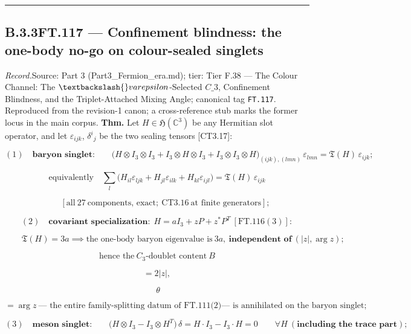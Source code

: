 \documentclass[11pt,openany]{report}
\theoremstyle{canonplain}
\theoremstyle{canondef}
\begin{document}
\vspace{2pt}\noindent\rule{\textwidth}{0.4pt}\vspace{2pt}

\medskip
\subsection*{\texorpdfstring{B.3.3\quad FT.117 — Confinement blindness: the one-body no-go on colour-sealed singlets}{FT.117 B.3.3}}
\label{tag:FT-117}
{\small \textit{Record.}\quad Source: Part 3 (Part3\_Fermion\_era.md); tier: Tier F.38 — The Colour Channel: The $\textbackslash{}varepsilon$-Selected $C\_3$, Confinement Blindness, and the Triplet-Attached Mixing Angle; canonical tag \texttt{FT.117}. Reproduced from the revision-1 canon; a cross-reference stub marks the former locus in the main corpus.}
\medskip
\textbf{Thm.} Let $H\in\mathfrak H(\mathbb C^3)$ be any Hermitian slot operator, and let $\varepsilon_{ijk}$, $\delta^i{}_j$ be the two sealing tensors [CT3.17]:

\[
(1)\quad\textbf{baryon singlet:}\qquad\bigl(H\otimes I_3\otimes I_3+I_3\otimes H\otimes I_3+I_3\otimes I_3\otimes H\bigr)_{(ijk),(lmn)}\,\varepsilon_{lmn}=\mathfrak T(H)\,\varepsilon_{ijk};
\]

\[
\text{equivalently}\quad\sum_l\bigl(H_{il}\varepsilon_{ljk}+H_{jl}\varepsilon_{ilk}+H_{kl}\varepsilon_{ijl}\bigr)=\mathfrak T(H)\,\varepsilon_{ijk}
\]

\[
\qquad [\text{all}\ 27\ \text{components, exact};\ \mathrm{CT3.16}\ \text{at finite generators}];
\]

\[
(2)\quad\textbf{covariant specialization:}\ \ H=aI_3+zP+z^{*}P^{T}\ [\mathrm{FT.116}(3)]:
\]

\[
\qquad \mathfrak T(H)=3a\implies\text{the one-body baryon eigenvalue is}\ 3a,\ \textbf{independent of}\ (|z|,\arg z);
\]

\[
\text{hence the}\ C_3\text{-doublet content}\ B
\]

\[
= 2|z|,
\]

\[
\ \theta
\]

\[
= \arg z\ \text{— the entire family-splitting datum of FT.111(2)}\text{— is annihilated on the baryon singlet};
\]

\[
(3)\quad\textbf{meson singlet:}\qquad\bigl(H\otimes I_3-I_3\otimes H^{T}\bigr)\,\delta=H\cdot I_3-I_3\cdot H=0\qquad\forall H\ (\textbf{including the trace part});
\]
\end{document}
